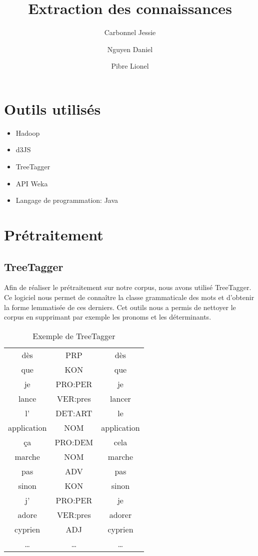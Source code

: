 \documentclass[a4paper,11pt]{report}
\title{Extraction des connaissances}
\author{Carbonnel Jessie \and Nguyen Daniel \and Pibre Lionel}
\begin{document}
\maketitle

\section{Outils utilisés}

\begin{itemize}
	\item Hadoop
	\item d3JS
	\item TreeTagger
	\item API Weka
	\item Langage de programmation: Java
\end{itemize}
\section{Prétraitement}
\subsection{TreeTagger}
Afin de réaliser le prétraitement sur notre corpus, nous avons utilisé TreeTagger. Ce logiciel nous permet de connaître la classe grammaticale des mots et d'obtenir la forme lemmatisée de ces derniers. Cet outils nous a permis de nettoyer le corpus en supprimant par exemple les pronoms et les déterminants.\\

\begin{table}[!h]
\centering
 \begin{tabular}{|c|c|c|}
 \hline
    dès&PRP&dès\\
    que&KON&que\\
    je&PRO:PER&je\\
    lance&VER:pres&lancer\\
    l'&DET:ART&le\\
    application&NOM&application\\
    ça&PRO:DEM&cela\\
    marche&NOM&marche\\
    pas&ADV&pas\\
    sinon&KON&sinon\\
    j'&PRO:PER&je\\
    adore&VER:pres&adorer\\
    cyprien&ADJ&cyprien\\
    \dots&\dots&\dots\\
 \hline
 \end{tabular}
 \caption{Exemple de TreeTagger}
\end{table}
\end{document}

